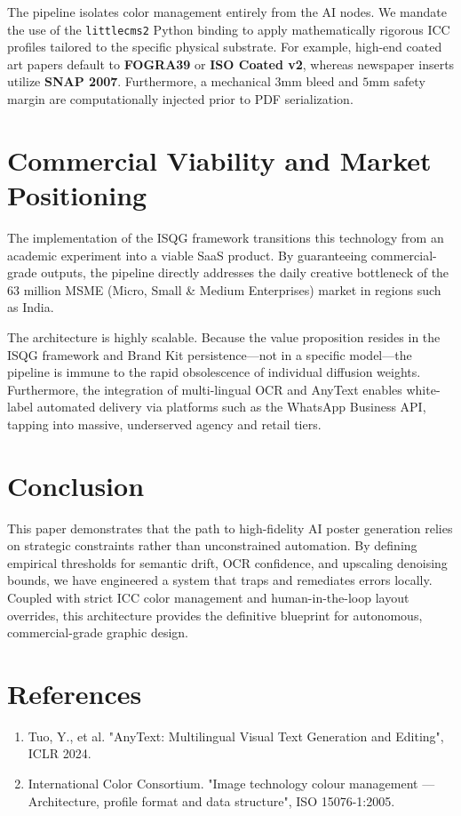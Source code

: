 \documentclass[10pt,journal,compsoc]{IEEEtran}
\begin{document}
The pipeline isolates color management entirely from the AI nodes. We mandate the use of the \texttt{littlecms2} Python binding to apply mathematically rigorous ICC profiles tailored to the specific physical substrate. For example, high-end coated art papers default to \textbf{FOGRA39} or \textbf{ISO Coated v2}, whereas newspaper inserts utilize \textbf{SNAP 2007}. Furthermore, a mechanical $3\text{mm}$ bleed and $5\text{mm}$ safety margin are computationally injected prior to PDF serialization.

\section{Commercial Viability and Market Positioning}
The implementation of the ISQG framework transitions this technology from an academic experiment into a viable SaaS product. By guaranteeing commercial-grade outputs, the pipeline directly addresses the daily creative bottleneck of the 63 million MSME (Micro, Small \& Medium Enterprises) market in regions such as India. 

The architecture is highly scalable. Because the value proposition resides in the ISQG framework and Brand Kit persistence—not in a specific model—the pipeline is immune to the rapid obsolescence of individual diffusion weights. Furthermore, the integration of multi-lingual OCR and AnyText enables white-label automated delivery via platforms such as the WhatsApp Business API, tapping into massive, underserved agency and retail tiers.

\section{Conclusion}
This paper demonstrates that the path to high-fidelity AI poster generation relies on strategic constraints rather than unconstrained automation. By defining empirical thresholds for semantic drift, OCR confidence, and upscaling denoising bounds, we have engineered a system that traps and remediates errors locally. Coupled with strict ICC color management and human-in-the-loop layout overrides, this architecture provides the definitive blueprint for autonomous, commercial-grade graphic design.

\section*{References}
\begin{enumerate}
    \item Tuo, Y., et al. "AnyText: Multilingual Visual Text Generation and Editing", ICLR 2024.
    \item International Color Consortium. "Image technology colour management — Architecture, profile format and data structure", ISO 15076-1:2005.
\end{enumerate}
\end{document}
